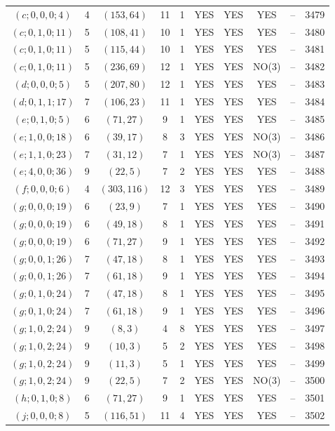 \begin{longtable}{|c|c|c|c|c|c|c|c|c|c|}
$(c; 0, 0, 0; 4)$ & 4 & $(153, 64)$ & 11 & 1 & YES & YES & YES & -- & 3479\\
$(c; 0, 1, 0; 11)$ & 5 & $(108, 41)$ & 10 & 1 & YES & YES & YES & -- & 3480\\
$(c; 0, 1, 0; 11)$ & 5 & $(115, 44)$ & 10 & 1 & YES & YES & YES & -- & 3481\\
$(c; 0, 1, 0; 11)$ & 5 & $(236, 69)$ & 12 & 1 & YES & YES & NO(3) & -- & 3482\\
$(d; 0, 0, 0; 5)$ & 5 & $(207, 80)$ & 12 & 1 & YES & YES & YES & -- & 3483\\
$(d; 0, 1, 1; 17)$ & 7 & $(106, 23)$ & 11 & 1 & YES & YES & YES & -- & 3484\\
$(e; 0, 1, 0; 5)$ & 6 & $(71, 27)$ & 9 & 1 & YES & YES & YES & -- & 3485\\
$(e; 1, 0, 0; 18)$ & 6 & $(39, 17)$ & 8 & 3 & YES & YES & NO(3) & -- & 3486\\
$(e; 1, 1, 0; 23)$ & 7 & $(31, 12)$ & 7 & 1 & YES & YES & NO(3) & -- & 3487\\
$(e; 4, 0, 0; 36)$ & 9 & $(22, 5)$ & 7 & 2 & YES & YES & YES & -- & 3488\\
$(f; 0, 0, 0; 6)$ & 4 & $(303, 116)$ & 12 & 3 & YES & YES & YES & -- & 3489\\
$(g; 0, 0, 0; 19)$ & 6 & $(23, 9)$ & 7 & 1 & YES & YES & YES & -- & 3490\\
$(g; 0, 0, 0; 19)$ & 6 & $(49, 18)$ & 8 & 1 & YES & YES & YES & -- & 3491\\
$(g; 0, 0, 0; 19)$ & 6 & $(71, 27)$ & 9 & 1 & YES & YES & YES & -- & 3492\\
$(g; 0, 0, 1; 26)$ & 7 & $(47, 18)$ & 8 & 1 & YES & YES & YES & -- & 3493\\
$(g; 0, 0, 1; 26)$ & 7 & $(61, 18)$ & 9 & 1 & YES & YES & YES & -- & 3494\\
$(g; 0, 1, 0; 24)$ & 7 & $(47, 18)$ & 8 & 1 & YES & YES & YES & -- & 3495\\
$(g; 0, 1, 0; 24)$ & 7 & $(61, 18)$ & 9 & 1 & YES & YES & YES & -- & 3496\\
$(g; 1, 0, 2; 24)$ & 9 & $(8, 3)$ & 4 & 8 & YES & YES & YES & -- & 3497\\
$(g; 1, 0, 2; 24)$ & 9 & $(10, 3)$ & 5 & 2 & YES & YES & YES & -- & 3498\\
$(g; 1, 0, 2; 24)$ & 9 & $(11, 3)$ & 5 & 1 & YES & YES & YES & -- & 3499\\
$(g; 1, 0, 2; 24)$ & 9 & $(22, 5)$ & 7 & 2 & YES & YES & NO(3) & -- & 3500\\
$(h; 0, 1, 0; 8)$ & 6 & $(71, 27)$ & 9 & 1 & YES & YES & YES & -- & 3501\\
$(j; 0, 0, 0; 8)$ & 5 & $(116, 51)$ & 11 & 4 & YES & YES & YES & -- & 3502
\end{longtable}
